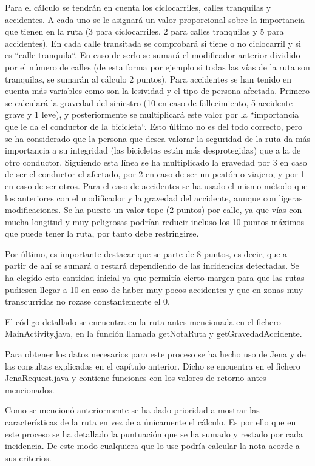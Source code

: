 Para el cálculo se tendrán en cuenta los ciclocarriles, calles tranquilas y accidentes. A cada uno se le asignará un valor proporcional sobre la importancia que tienen en la ruta (3 para ciclocarriles, 2 para calles tranquilas y 5 para accidentes). En cada calle transitada se comprobará si tiene o no ciclocarril y si es ``calle tranquila``. En caso de serlo se sumará el modificador anterior dividido por el número de calles (de esta forma por ejemplo si todas las vías de la ruta son tranquilas, se sumarán al cálculo 2 puntos).
Para accidentes se han tenido en cuenta más variables como son la lesividad y el tipo de persona afectada. Primero se calculará la gravedad del siniestro (10 en caso de fallecimiento, 5 accidente grave y 1 leve), y posteriormente se multiplicará este valor por la ``importancia que le da el conductor de la bicicleta``. Esto último no es del todo correcto, pero se ha considerado que la persona que desea valorar la seguridad de la ruta da más importancia a su integridad (las bicicletas están más desprotegidas) que a la de otro conductor. Siguiendo esta línea se ha multiplicado la gravedad por 3 en caso de ser el conductor el afectado, por 2 en caso de ser un peatón o viajero, y por 1 en caso de ser otros.
Para el caso de accidentes se ha usado el mismo método que los anteriores con el modificador y la gravedad del accidente, aunque con ligeras modificaciones. Se ha puesto un valor tope (2 puntos) por calle, ya que vías con mucha longitud y muy peligrosas podrían reducir incluso los 10 puntos máximos que puede tener la ruta, por tanto debe restringirse.

Por último, es importante destacar que se parte de 8 puntos, es decir, que a partir de ahí se sumará o restará dependiendo de las incidencias detectadas. Se ha elegido esta cantidad inicial ya que permitía cierto margen para que las rutas pudiesen llegar a 10 en caso de haber muy pocos accidentes y que en zonas muy transcurridas no rozase constantemente el 0.

El código detallado se encuentra en la ruta antes mencionada en el fichero MainActivity.java, en la función llamada getNotaRuta y getGravedadAccidente.

Para obtener los datos necesarios para este proceso se ha hecho uso de Jena y de las consultas explicadas en el capítulo anterior. Dicho se encuentra en el fichero JenaRequest.java y contiene funciones con los valores de retorno antes mencionados.

Como se mencionó anteriormente se ha dado prioridad a mostrar las características de la ruta en vez de a únicamente el cálculo. Es por ello que en este proceso se ha detallado la puntuación que se ha sumado y restado por cada incidencia. De este modo cualquiera que lo use podría calcular la nota acorde a sus criterios.


